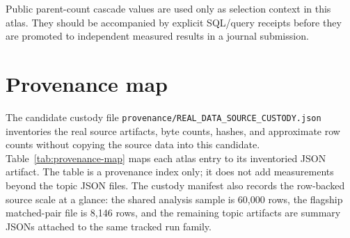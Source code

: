 \documentclass[twocolumn]{aastex631}
\begin{document}
Public parent-count cascade values are used only as selection context in this atlas. They should be accompanied by explicit SQL/query receipts before they are promoted to independent measured results in a journal submission.

\section{Provenance map}
The candidate custody file \texttt{provenance/REAL\_DATA\_SOURCE\_CUSTODY.json} inventories the real source artifacts, byte counts, hashes, and approximate row counts without copying the source data into this candidate. Table~\ref{tab:provenance-map} maps each atlas entry to its inventoried JSON artifact. The table is a provenance index only; it does not add measurements beyond the topic JSON files.
The custody manifest also records the row-backed source scale at a glance: the shared analysis sample is 60,000 rows, the flagship matched-pair file is 8,146 rows, and the remaining topic artifacts are summary JSONs attached to the same tracked run family.
\end{document}
